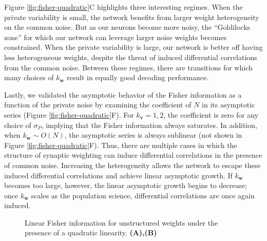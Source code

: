 \documentclass[12pt]{article}
\begin{document}
	Figure \ref{fig:fisher-quadratic}C highlights three interesting regimes. When the private variability is small, the network benefits from larger weight heterogeneity on the common noise. But as our neurons become more noisy, the ``Goldilocks zone'' for which our network can leverage larger noise weights becomes constrained. When the private variability is large, our network is better off having less heterogeneous weights, despite the threat of induced differential correlations from the common noise. Between these regimes, there are transitions for which many choices of $k_{\mathbf{w}}$ result in equally good decoding performance.
	
	Lastly, we validated the asymptotic behavior of the Fisher information as a function of the private noise by examining the coefficient of $N$ in its asymptotic series (Figure \ref{fig:fisher-quadratic}F). For $k_{\mathbf{v}}=1,2$, the coefficient is zero for any choice of $\sigma_P$, implying that the Fisher information always saturates. In addition, when $k_{\mathbf{w}}\sim O(N)$, the asymptotic series is always sublinear (not shown in Figure \ref{fig:fisher-quadratic}F). Thus, there are multiple cases in which the structure of synaptic weighting can induce differential correlations in the presence of common noise. Increasing the heterogeneity allows the network to escape these induced differential correlations and achieve linear asymptotic growth. If $k_{\mathbf{w}}$ becomes too large, however, the linear asymptotic growth begins to decrease; once $k_{\mathbf{w}}$ scales as the population science, differential correlations are once again induced.
	
	\begin{figure}[t]
		\centering
		\caption{Linear Fisher information for unstructured weights under the presence of a quadratic linearity. \textbf{(A),(B)} } 
		\label{fig:unstructured-quadratic-fisher}
	\end{figure}
	
\end{document}
